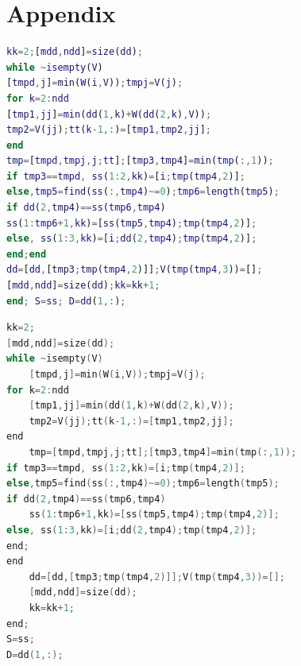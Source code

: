 \documentclass{apmcmthesis}
\begin{document}
\newpage

\section{Appendix}
\begin{lstlisting}[language=matlab,caption={The matlab Source code of Algorithm}]
kk=2;[mdd,ndd]=size(dd);
while ~isempty(V)
[tmpd,j]=min(W(i,V));tmpj=V(j);
for k=2:ndd
[tmp1,jj]=min(dd(1,k)+W(dd(2,k),V));
tmp2=V(jj);tt(k-1,:)=[tmp1,tmp2,jj];
end
tmp=[tmpd,tmpj,j;tt];[tmp3,tmp4]=min(tmp(:,1));
if tmp3==tmpd, ss(1:2,kk)=[i;tmp(tmp4,2)];
else,tmp5=find(ss(:,tmp4)~=0);tmp6=length(tmp5);
if dd(2,tmp4)==ss(tmp6,tmp4)
ss(1:tmp6+1,kk)=[ss(tmp5,tmp4);tmp(tmp4,2)];
else, ss(1:3,kk)=[i;dd(2,tmp4);tmp(tmp4,2)];
end;end
dd=[dd,[tmp3;tmp(tmp4,2)]];V(tmp(tmp4,3))=[];
[mdd,ndd]=size(dd);kk=kk+1;
end; S=ss; D=dd(1,:);
 \end{lstlisting}
\begin{lstlisting}[language=c,caption={The lingo source code}]
kk=2;
[mdd,ndd]=size(dd);
while ~isempty(V)
    [tmpd,j]=min(W(i,V));tmpj=V(j);
for k=2:ndd
    [tmp1,jj]=min(dd(1,k)+W(dd(2,k),V));
    tmp2=V(jj);tt(k-1,:)=[tmp1,tmp2,jj];
end
    tmp=[tmpd,tmpj,j;tt];[tmp3,tmp4]=min(tmp(:,1));
if tmp3==tmpd, ss(1:2,kk)=[i;tmp(tmp4,2)];
else,tmp5=find(ss(:,tmp4)~=0);tmp6=length(tmp5);
if dd(2,tmp4)==ss(tmp6,tmp4)
    ss(1:tmp6+1,kk)=[ss(tmp5,tmp4);tmp(tmp4,2)];
else, ss(1:3,kk)=[i;dd(2,tmp4);tmp(tmp4,2)];
end;
end
    dd=[dd,[tmp3;tmp(tmp4,2)]];V(tmp(tmp4,3))=[];
    [mdd,ndd]=size(dd);
    kk=kk+1;
end;
S=ss;
D=dd(1,:);
 \end{lstlisting}
\end{document}
